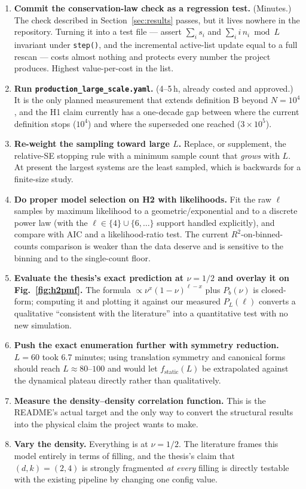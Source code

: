 \documentclass[11pt,a4paper]{article}
\begin{document}
\begin{enumerate}
\item \textbf{Commit the conservation-law check as a regression test.}
(Minutes.) The check described in Section~\ref{sec:results} passes, but it
lives nowhere in the repository. Turning it into a test file --- assert
$\sum_i s_i$ and $\sum_i i\,n_i \bmod L$ invariant under \texttt{step()},
and the incremental active-list update equal to a full rescan --- costs
almost nothing and protects every number the project produces. Highest
value-per-cost in the list.

\item \textbf{Run \texttt{production\_large\_scale.yaml}.} (4--5\,h,
already costed and approved.) It is the only planned measurement that
extends definition B beyond $N=10^4$, and the H1 claim currently has a
one-decade gap between where the current definition stops ($10^4$) and where
the superseded one reached ($3\times10^5$).

\item \textbf{Re-weight the sampling toward large $L$.} Replace, or
supplement, the relative-SE stopping rule with a minimum sample count that
\emph{grows} with $L$. At present the largest systems are the least
sampled, which is backwards for a finite-size study.

\item \textbf{Do proper model selection on H2 with likelihoods.} Fit the
raw $\ell$ samples by maximum likelihood to a geometric/exponential and to
a discrete power law (with the $\ell\in\{4\}\cup\{6,\dots\}$ support handled
explicitly), and compare with AIC and a likelihood-ratio test. The current
$R^2$-on-binned-counts comparison is weaker than the data deserve and is
sensitive to the binning and to the single-count floor.

\item \textbf{Evaluate the thesis's exact prediction at $\nu=1/2$ and
overlay it on Fig.~\ref{fig:h2pmf}.} The formula
$\propto\nu^x(1-\nu)^{\ell-x}$ plus $P_b(\nu)$ is closed-form; computing it
and plotting it against our measured $P_L(\ell)$ converts a qualitative
``consistent with the literature'' into a quantitative test with no new
simulation.

\item \textbf{Push the exact enumeration further with symmetry reduction.}
$L=60$ took 6.7 minutes; using translation symmetry and canonical forms
should reach $L\approx80$--$100$ and would let $f_{\text{static}}(L)$ be
extrapolated against the dynamical plateau directly rather than
qualitatively.

\item \textbf{Measure the density--density correlation function.} This is
the README's actual target and the only way to convert the structural
results into the physical claim the project wants to make.

\item \textbf{Vary the density.} Everything is at $\nu=1/2$. The literature
frames this model entirely in terms of filling, and the thesis's claim that
$(d,k)=(2,4)$ is strongly fragmented \emph{at every} filling is directly
testable with the existing pipeline by changing one config value.
\end{enumerate}
\end{document}
